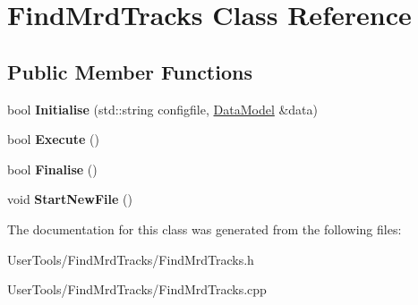 \hypertarget{classFindMrdTracks}{
\section{FindMrdTracks Class Reference}
\label{classFindMrdTracks}
}
\subsection*{Public Member Functions}
\begin{DoxyCompactItemize}
\item 
\hypertarget{classFindMrdTracks_a32cc40daea77e8fc6d4f64791922696e}{
bool {\bfseries Initialise} (std::string configfile, \hyperlink{classDataModel}{DataModel} \&data)}
\label{classFindMrdTracks_a32cc40daea77e8fc6d4f64791922696e}

\item 
\hypertarget{classFindMrdTracks_a24260dbeaee440f91c5aaad0af93886c}{
bool {\bfseries Execute} ()}
\label{classFindMrdTracks_a24260dbeaee440f91c5aaad0af93886c}

\item 
\hypertarget{classFindMrdTracks_a4c03c3790e73938bc9786981de31bab4}{
bool {\bfseries Finalise} ()}
\label{classFindMrdTracks_a4c03c3790e73938bc9786981de31bab4}

\item 
\hypertarget{classFindMrdTracks_acdbbb5dc3f26dcbc527d08483b2bcc9e}{
void {\bfseries StartNewFile} ()}
\label{classFindMrdTracks_acdbbb5dc3f26dcbc527d08483b2bcc9e}

\end{DoxyCompactItemize}


The documentation for this class was generated from the following files:\begin{DoxyCompactItemize}
\item 
UserTools/FindMrdTracks/FindMrdTracks.h\item 
UserTools/FindMrdTracks/FindMrdTracks.cpp\end{DoxyCompactItemize}
